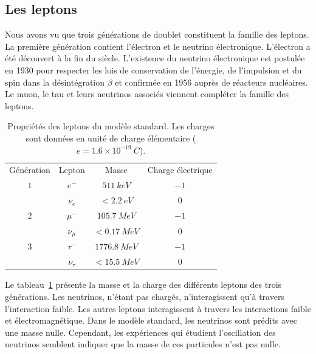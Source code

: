 \subsection{Les leptons}
Nous avons vu que trois générations de doublet constituent la famille des leptons. La première génération contient l'électron et le neutrino électronique. L'électron a été découvert à la fin du  siècle. L'existence du neutrino électronique est postulée en 1930 pour respecter les lois de conservation de l'énergie, de l'impulsion et du spin dans la désintégration $\beta$ et confirmée en 1956 auprès de réacteurs nucléaires. Le muon, le tau et leurs neutrinos associés viennent compléter la famille des leptons. %
\begin{table}[!ht]
  \begin{center}
    \small
    \begin{tabular}{c|c|c|c}
      \rowcolor{black!20!white}Génération & Lepton & Masse & Charge électrique\\
      \rowcolor{black!5!white}\hline
      \rowcolor{black!5!white}$1$ & $e^-$ & $511~keV$ & $-1$ \\
      \rowcolor{black!5!white}$ $ & $\nu_e$ & $<2.2~eV$ & $0$ \\
      \rowcolor{black!5!white}\hline
      \rowcolor{black!5!white}$2$ & $\mu^-$ & $105.7~MeV$ & $-1$ \\
      \rowcolor{black!5!white}$ $ & $\nu_{\mu}$ & $<0.17~MeV$ & $0$ \\
      \rowcolor{black!5!white}\hline
      \rowcolor{black!5!white}$3$ & $\tau^-$ & $1776.8~MeV$ & $-1$ \\
      \rowcolor{black!5!white}$ $ & $\nu_{\tau}$ & $<15.5~MeV$ & $0$ \\
    \end{tabular}
  \end{center}  
  \caption{Propriétés des leptons du modèle standard. Les charges sont données en unité de charge élémentaire ($e=1.6\times10^{-19}~C$).}
  \label{tab.lepton_pro}
\end{table}
Le tableau~\ref{tab.lepton_pro} présente la masse et la charge des différents leptons des trois générations. Les neutrinos, n'étant pas chargés, n'interagissent qu'à travers l'interaction faible. Les autres leptons interagissent à travers les interactions faible et électromagnétique. Dans le modèle standard, les neutrinos sont prédits avec une masse nulle. Cependant, les expériences qui étudient l'oscillation des neutrinos semblent indiquer que la masse de ces particules n'est pas nulle. 

